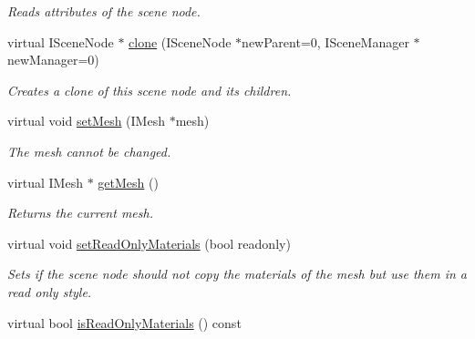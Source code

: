 \begin{DoxyCompactItemize}
\begin{DoxyCompactList}\small\item\em Reads attributes of the scene node. \end{DoxyCompactList}\item 
\hypertarget{classirr_1_1scene_1_1_c_sphere_scene_node_a6128ec24d202ad238d596915b641f5b4}{virtual I\-Scene\-Node $\ast$ \hyperlink{classirr_1_1scene_1_1_c_sphere_scene_node_a6128ec24d202ad238d596915b641f5b4}{clone} (I\-Scene\-Node $\ast$new\-Parent=0, I\-Scene\-Manager $\ast$new\-Manager=0)}\label{classirr_1_1scene_1_1_c_sphere_scene_node_a6128ec24d202ad238d596915b641f5b4}

\begin{DoxyCompactList}\small\item\em Creates a clone of this scene node and its children. \end{DoxyCompactList}\item 
\hypertarget{classirr_1_1scene_1_1_c_sphere_scene_node_ae3797d9f432274fe0fb67c03f2ada4ee}{virtual void \hyperlink{classirr_1_1scene_1_1_c_sphere_scene_node_ae3797d9f432274fe0fb67c03f2ada4ee}{set\-Mesh} (I\-Mesh $\ast$mesh)}\label{classirr_1_1scene_1_1_c_sphere_scene_node_ae3797d9f432274fe0fb67c03f2ada4ee}

\begin{DoxyCompactList}\small\item\em The mesh cannot be changed. \end{DoxyCompactList}\item 
\hypertarget{classirr_1_1scene_1_1_c_sphere_scene_node_aeedfc04b7f66382846a9fd200bbdfa2a}{virtual I\-Mesh $\ast$ \hyperlink{classirr_1_1scene_1_1_c_sphere_scene_node_aeedfc04b7f66382846a9fd200bbdfa2a}{get\-Mesh} ()}\label{classirr_1_1scene_1_1_c_sphere_scene_node_aeedfc04b7f66382846a9fd200bbdfa2a}

\begin{DoxyCompactList}\small\item\em Returns the current mesh. \end{DoxyCompactList}\item 
\hypertarget{classirr_1_1scene_1_1_c_sphere_scene_node_af6f216e54dbed390696484eb9f1b86c1}{virtual void \hyperlink{classirr_1_1scene_1_1_c_sphere_scene_node_af6f216e54dbed390696484eb9f1b86c1}{set\-Read\-Only\-Materials} (bool readonly)}\label{classirr_1_1scene_1_1_c_sphere_scene_node_af6f216e54dbed390696484eb9f1b86c1}

\begin{DoxyCompactList}\small\item\em Sets if the scene node should not copy the materials of the mesh but use them in a read only style. \end{DoxyCompactList}\item 
\hypertarget{classirr_1_1scene_1_1_c_sphere_scene_node_ab37ac3c2b7fde5a179b87956258f741f}{virtual bool \hyperlink{classirr_1_1scene_1_1_c_sphere_scene_node_ab37ac3c2b7fde5a179b87956258f741f}{is\-Read\-Only\-Materials} () const }\label{classirr_1_1scene_1_1_c_sphere_scene_node_ab37ac3c2b7fde5a179b87956258f741f}


\end{DoxyCompactItemize}
